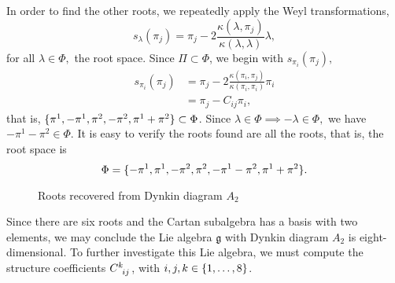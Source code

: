 In order to find the other roots, we repeatedly apply the Weyl transformations,
\begin{equation*}
    s_{\lambda}(\pi_j) = \pi_j - 2 \frac{\kappa(\lambda,\pi_j)}{\kappa(\lambda, \lambda)} \lambda,
\end{equation*}
for all \(\lambda \in \Phi,\) the root space. Since \(\Pi \subset \Phi\), we begin with \(s_{\pi_i}(\pi_j),\)
\begin{align*}
    s_{\pi_i}(\pi_j) &= \pi_j - 2\frac{\kappa(\pi_i, \pi_j)}{\kappa(\pi_i, \pi_i)}\pi_i\\
                     &= \pi_j - C_{ij} \pi_i,
\end{align*}
that is, \(\{\pi^1, -\pi^1, \pi^2, -\pi^2, \pi^1 + \pi^2\} \subset \Phi\). Since \(\lambda \in \Phi \implies -\lambda \in \Phi,\) we have \(-\pi^1 - \pi^2 \in \Phi.\) It is easy to verify the roots found are all the roots, that is, the root space is
\begin{equation*}
    \Phi = \{-\pi^1, \pi^1, -\pi^2, \pi^2, -\pi^1-\pi^2, \pi^1+\pi^2\}.
\end{equation*}
\begin{figure}[H]
    \centering
    \caption{Roots recovered from Dynkin diagram \(A_2\)}
\end{figure}

Since there are six roots and the Cartan subalgebra has a basis with two elements, we may conclude the Lie algebra \(\mathfrak{g}\) with Dynkin diagram \(A_2\) is eight-dimensional. To further investigate this Lie algebra, we must compute the structure coefficients \(C\indices{^k_{ij}}\), with \(i,j,k \in \{1,\dots, 8\}\).

